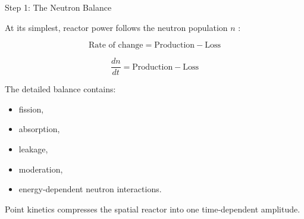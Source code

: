 \documentclass[aspectratio=169]{beamer}
\begin{document}
\begin{frame}{Step 1: The Neutron Balance}

    At its simplest, reactor power follows the neutron population $n$
    \cite{bell1970nuclear}:

    \[
        \text{Rate of change}
        =
        \text{Production}
        -
        \text{Loss}
    \]

    \[
        \frac{dn}{dt}
        =
        \text{Production}
        -
        \text{Loss}
    \]

    \vspace{1em}

    The detailed balance contains:

    \begin{itemize}

        \item fission,

        \item absorption,

        \item leakage,

        \item moderation,

        \item energy-dependent neutron interactions.

    \end{itemize}

    Point kinetics compresses the spatial reactor into one time-dependent
    amplitude.

\end{frame}


\end{document}
